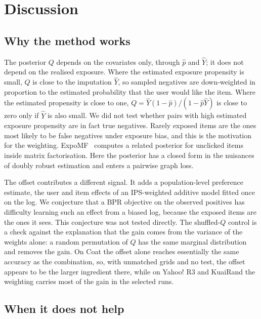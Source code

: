 \sloppy
\section{Discussion}\label{sec:discussion}

\subsection{Why the method works}\label{sec:why}

The posterior $Q$ depends on the covariates only, through $\hat p$ and $\hat Y$; it does not depend on the realised
exposure. Where the estimated exposure propensity is small, $Q$ is close to the imputation $\hat Y$, so sampled
negatives are down-weighted in proportion to the estimated probability that the user would like the item. Where the
estimated propensity is close to one, $Q=\hat Y(1-\hat p)/(1-\hat p\hat Y)$ is close to zero only if $\hat Y$ is also
small. We did not test whether pairs with high estimated exposure propensity are in fact true negatives. Rarely
exposed items are the ones most likely to be false negatives under exposure bias, and this is the motivation for the
weighting. ExpoMF~\citep{liang2016exposure} computes a related posterior for unclicked items
inside matrix factorisation. Here the posterior has a closed form in the nuisances of doubly robust estimation and
enters a pairwise graph loss.

The offset contributes a different signal. It adds a population-level preference estimate, the user and item
effects of an IPS-weighted additive model fitted once on the log. We conjecture that a BPR objective on the observed
positives has difficulty learning such an effect from a biased log, because the exposed items are the ones it sees.
This conjecture was not tested directly. The shuffled-$Q$ control is a check against the explanation that the gain
comes from the variance of the weights alone: a random permutation of $Q$
has the same marginal distribution and removes the gain. On Coat the offset alone reaches essentially the same
accuracy as the combination, so, with unmatched grids and no test, the offset appears to be the larger ingredient there,
while on Yahoo! R3 and KuaiRand the weighting carries most of the gain in the selected runs.

\subsection{When it does not help}\label{sec:when}

